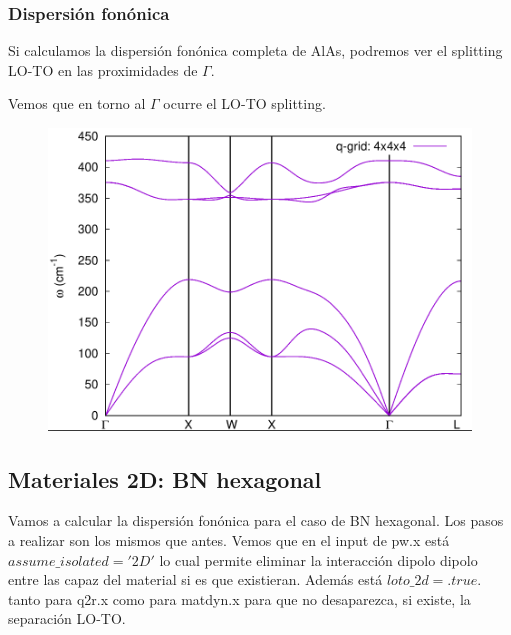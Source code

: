 \subsubsection{Dispersión fonónica}

  Si calculamos la dispersión fonónica completa de AlAs, podremos ver el splitting LO-TO en las proximidades de $\Gamma$.


  Vemos que en torno al $\Gamma$ ocurre el LO-TO splitting.

    \begin{figure}[H]
        \centering
        \includegraphics[scale = 0.4]{figs/D5/AlAs_disp.png}
    \end{figure}

\subsection{Materiales 2D: BN hexagonal}

  Vamos a calcular la dispersión fonónica para el caso de BN hexagonal. Los pasos a realizar son los mismos que antes. Vemos que en el input de pw.x está $assume\_isolated='2D'$ lo cual permite eliminar la interacción dipolo dipolo entre las capaz del material si es que existieran. Además está $loto\_2d=.true.$ tanto para q2r.x como para matdyn.x para que no desaparezca, si existe, la separación LO-TO.


